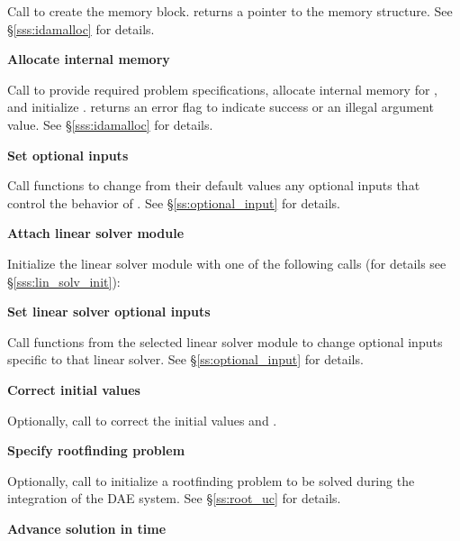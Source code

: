 \begin{Steps}
  Call \id{();} 
  to create the {\ida} memory block.
   returns a pointer to the {\ida} memory structure.
  See \S\ref{sss:idamalloc} for details.

\item\label{i:ida_malloc} 
  {\bf Allocate internal memory}

  Call  
  to provide required problem specifications,
  allocate internal memory for {\ida}, 
  and initialize {\ida}.
   returns an error flag to indicate success or an illegal argument value.
  See \S\ref{sss:idamalloc} for details.
  
\item
  {\bf Set optional inputs}

  Call  functions to change from their default values any
  optional inputs that control the behavior of {\ida}.
  See \S\ref{ss:optional_input} for details.

\item\label{i:lin_solver} 
  {\bf Attach linear solver module}

  Initialize the linear solver module
  with one of the following calls (for details see \S\ref{sss:lin_solv_init}):

  {\s} 

  {\s} 

  
\item
  {\bf Set linear solver optional inputs}

  Call  functions from the selected linear solver module to
  change optional inputs specific to that linear solver.
  See \S\ref{ss:optional_input} for details.

\item 
  {\bf Correct initial values}

  Optionally, call  to correct the initial values
   and .

\item
  {\bf Specify rootfinding problem}

  Optionally, call  to initialize a rootfinding problem
  to be solved during the integration of the DAE system.
  See \S\ref{ss:root_uc} for details.

\item
  {\bf Advance solution in time}


\end{Steps}
